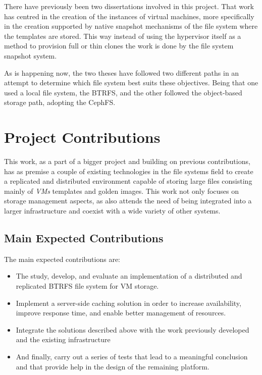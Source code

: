 There have previously been two dissertations involved in this project. That work has centred in the creation of the instances of virtual machines, more specifically in the creation supported by native snapshot mechanisms of the file system where the templates are stored. This way instead of using the hypervisor itself as a method to provision full or thin clones the work is done by the file system snapshot system.

As is happening now, the two theses have followed two different paths in an attempt to determine which file system best suits these objectives. Being that one used a local file system, the BTRFS, and the other followed the object-based storage path, adopting the CephFS.


\section{Project Contributions} %
\label{sec:project_contributions}

This work, as a part of a bigger project and building on previous contributions, has as premise a couple of existing technologies in the file systems field to create a replicated and distributed environment capable of storing large files consisting mainly of \textit{VMs} templates and golden images. This work not only focuses on storage management aspects, as also attends the need of being integrated into a larger infrastructure and coexist with a wide variety of other systems.
\\
\newpage

\subsection{Main Expected Contributions} %
\label{sub:main_expected_contributions}

The main expected contributions are: 

\begin{itemize}

  \item The study, develop, and evaluate an implementation of a distributed and replicated BTRFS file system for VM storage.
  \item Implement a server-side caching solution in order to increase availability, improve response time, and enable better management of resources.
  \item Integrate the solutions described above  with the work previously developed and the existing infrastructure
  \item And finally, carry out a series of tests that lead to a meaningful conclusion and that provide help in the design of the remaining platform.

\end{itemize}

